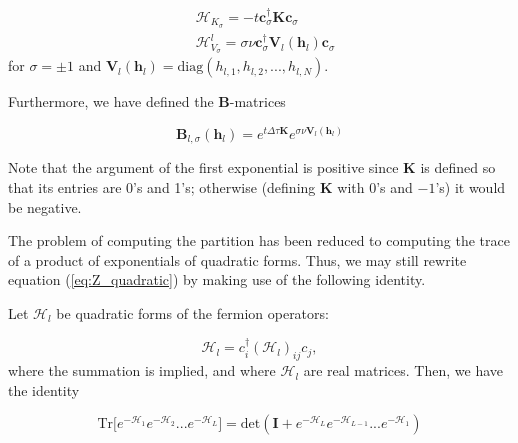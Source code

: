 \documentclass[10pt, twocolumn, twoside]{article}
\begin{document}
\begin{equation}
\begin{split}
&\mathcal{H}_{K_\sigma} = - t \bm c_\sigma^\dagger \bm K \bm c_\sigma \\
&\mathcal{H}_{V_\sigma}^l = \sigma \nu \bm c_\sigma^\dagger \bm V_l (\bm h_l) \bm c_\sigma
\end{split}
\end{equation}
for $\sigma = \pm 1$ and $\bm V_l ( \bm h_l ) = \text{diag} ( h_{l, 1} , h_{l, 2}, ... , h_{l, N} )$.

Furthermore, we have defined the $\bm B$-matrices

\begin{equation}
\bm B_{l, \sigma} ( \bm h_l ) = e^{t \Delta \tau \bm K} e^{\sigma \nu \bm V_l (\bm h_l)}
\end{equation}

Note that the argument of the first exponential is positive since $\bm K$ is defined so that its entries are 0's and 1's; otherwise (defining $\bm K$ with 0's and $-1$'s) it would be negative.

The problem of computing the partition has been reduced to computing the trace of a product of exponentials of quadratic forms. Thus, we may still rewrite equation (\ref{eq:Z_quadratic}) by making use of the following identity.

Let $\mathcal{H}_l$ be quadratic forms of the fermion operators:

\begin{equation}
\mathcal{H}_l = c_i^\dagger (\mathcal{H}_l)_{ij} c_j,
\end{equation}
where the summation is implied, and where $\mathcal{H}_l$ are real matrices. Then, we have the identity

\begin{equation}
\text{Tr} \big[ e^{-\mathcal{H}_1 } e^{-\mathcal{H}_2 } ... e^{-\mathcal{H}_L } \big] = \text{det} ( \bm I + e^{-\mathcal{H}_L} e^{-\mathcal{H}_{L-1}} ... e^{-\mathcal{H}_1} )
\end{equation}


\end{document}
